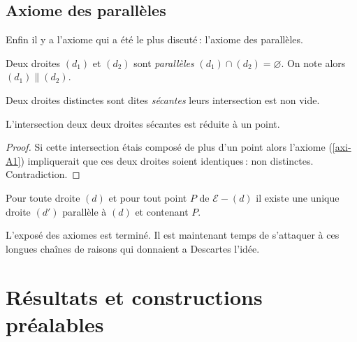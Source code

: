         \subsection{Axiome des parallèles}

Enfin il y a l'axiome qui a été le plus discuté\,: l'axiome des parallèles.

\begin{defi}
    Deux droites $(d_1)$ et $(d_2)$ sont \emph{parallèles} \ssi $(d_1)\cap (d_2) = \varnothing$. On note alors $(d_1)\|(d_2)$. 
\end{defi}        
\begin{defi}\label{def-secantes}
    Deux droites distinctes sont dites \emph{sécantes} \ssi leurs intersection est non vide.
\end{defi}
\begin{thm}\label{thm-droitesecante}
    L'intersection deux deux droites sécantes est réduite à un point.
\end{thm}
\begin{proof}
    Si cette intersection étais composé de plus d'un point alors l'axiome (\ref{axi-A1}) impliquerait que ces deux droites soient identiques\,: non distinctes. Contradiction.
\end{proof}
\begin{axi}\label{axi-parra}
    Pour toute droite $(d)$ et pour tout point $P$ de $\mathcal{E}-(d)$ il existe une unique droite $(d')$ parallèle à $(d)$ et contenant $P$.
\end{axi}

L'exposé des axiomes est terminé. Il est maintenant temps de s'attaquer à ces longues chaînes de raisons qui donnaient a Descartes l'idée.


    \section{Résultats et constructions préalables}

